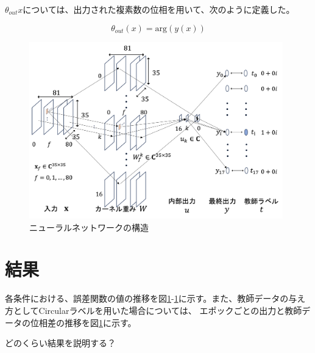 \documentclass[11pt,a4paper,uplatex]{ujarticle}
\begin{document}
  $\theta_{out}{x}$については、出力された複素数の位相を用いて、次のように定義した。

  \begin{equation}
    \theta_{out}(x) = \mathrm{arg}(y(x))
  \end{equation} %

  \begin{figure}[hbtp]
    \centering
    \includegraphics[keepaspectratio, width=110mm]{Images/network.png}
    \caption{ニューラルネットワークの構造}
    \label{fig:neuralnet}
  \end{figure}
  

\section{結果}
  各条件における、誤差関数の値の推移を図\ref{}-\ref{}に示す。また、教師データの与え方としてCircularラベルを用いた場合については、
  エポックごとの出力と教師データの位相差の推移を図\ref{}に示す。

  どのくらい結果を説明する？
\end{document}
